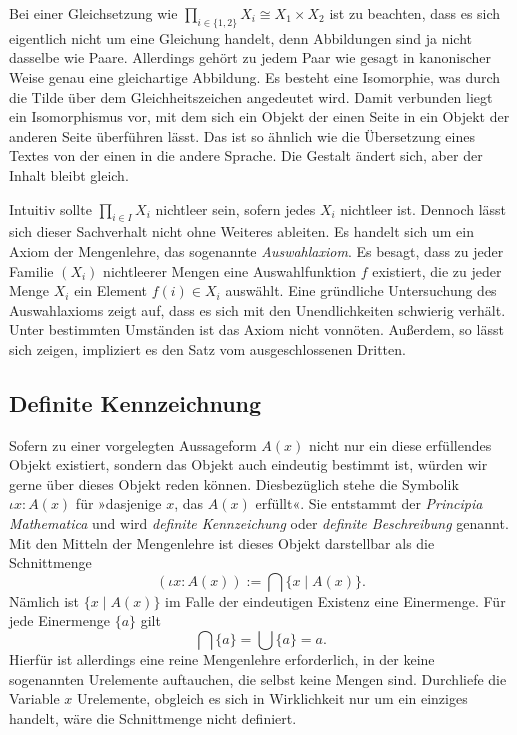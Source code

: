 Bei einer Gleichsetzung wie $\prod_{i\in\{1,2\}} X_i\cong X_1\times X_2$ ist
zu beachten, dass es sich eigentlich nicht um eine Gleichung handelt, denn
Abbildungen sind ja nicht dasselbe wie Paare. Allerdings gehört zu jedem
Paar wie gesagt in kanonischer Weise genau eine gleichartige Abbildung.
Es besteht eine Isomorphie, was durch die Tilde über dem Gleichheitszeichen
angedeutet wird. Damit verbunden liegt ein Isomorphismus vor, mit dem
sich ein Objekt der einen Seite in ein Objekt der anderen Seite
überführen lässt. Das ist so ähnlich wie die Übersetzung eines Textes
von der einen in die andere Sprache. Die Gestalt ändert sich, aber der
Inhalt bleibt gleich.

Intuitiv sollte $\prod_{i\in I} X_i$ nichtleer sein, sofern jedes $X_i$
nichtleer ist. Dennoch lässt sich dieser Sachverhalt nicht ohne Weiteres
ableiten. Es handelt sich um ein Axiom der Mengenlehre, das sogenannte
\emph{Auswahlaxiom}. Es besagt, dass zu jeder
Familie $(X_i)$ nichtleerer Mengen eine Auswahlfunktion $f$ existiert,
die zu jeder Menge $X_i$ ein Element $f(i)\in X_i$ auswählt.
Eine gründliche Untersuchung des Auswahlaxioms zeigt auf, dass es sich
mit den Unendlichkeiten schwierig verhält. Unter bestimmten Umständen
ist das Axiom nicht vonnöten. Außerdem, so lässt sich zeigen, impliziert
es den Satz vom ausgeschlossenen Dritten.

\subsection{Definite Kennzeichnung}

Sofern zu einer vorgelegten Aussageform $A(x)$ nicht nur ein diese
erfüllendes Objekt existiert, sondern das Objekt auch eindeutig
bestimmt ist, würden wir gerne über dieses Objekt reden können.
Diesbezüglich stehe die Symbolik $\iota x\colon A(x)$ für
»dasjenige $x$, das $A(x)$ erfüllt«. Sie entstammt der
\emph{Principia Mathematica} und wird \emph{definite Kennzeichung}%
oder \emph{definite Beschreibung} genannt. Mit den Mitteln der
Mengenlehre ist dieses Objekt darstellbar als die Schnittmenge
\[(\iota x\colon A(x)) := {\textstyle\bigcap}\{x\mid A(x)\}.\]
Nämlich ist $\{x\mid A(x)\}$ im Falle der eindeutigen Existenz eine
Einermenge. Für jede Einermenge $\{a\}$ gilt
\[\textstyle\bigcap\{a\} = \bigcup\{a\} = a.\]
Hierfür ist allerdings eine reine Mengenlehre erforderlich, in der
keine sogenannten Urelemente auftauchen, die selbst keine Mengen sind.
Durchliefe die Variable $x$ Urelemente, obgleich es sich in Wirklichkeit
nur um ein einziges handelt, wäre die Schnittmenge nicht definiert.


